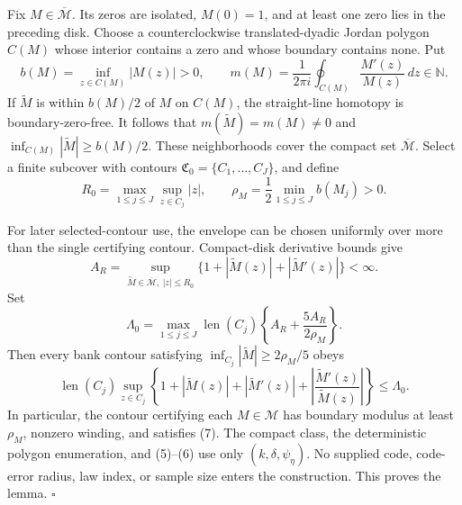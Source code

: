 Fix \(M\in\overline{\mathscr M}\).  Its zeros are isolated, \(M(0)=1\), and at least one zero lies in the preceding disk.  Choose a counterclockwise translated-dyadic Jordan polygon \(C(M)\) whose interior contains a zero and whose boundary contains none.  Put
\[
 b(M)=\inf_{z\in C(M)}|M(z)|>0,
 \qquad
 m(M)=\frac{1}{2\pi i}\oint_{C(M)}\frac{M'(z)}{M(z)}\,dz\in\mathbb N. \tag{4}
\]
If \(\widetilde M\) is within \(b(M)/2\) of \(M\) on \(C(M)\), the straight-line homotopy is boundary-zero-free.  It follows that \(m(\widetilde M)=m(M)\ne0\) and \(\inf_{C(M)}|\widetilde M|\ge b(M)/2\).  These neighborhoods cover the compact set \(\overline{\mathscr M}\).  Select a finite subcover with contours \(\mathfrak C_0=\{C_1,\ldots,C_J\}\), and define
\[
 R_0=\max_{1\le j\le J}\sup_{z\in C_j}|z|,
 \qquad
 \rho_M=\frac12\min_{1\le j\le J}b(M_j)>0. \tag{5}
\]

For later selected-contour use, the envelope can be chosen uniformly over more than the single certifying contour.  Compact-disk derivative bounds give
\[
 A_R=\sup_{\widetilde M\in\overline{\mathscr M},\ |z|\le R_0}
 \{1+|\widetilde M(z)|+|\widetilde M'(z)|\}<\infty.
\]
Set
\[
 \Lambda_0=
 \max_{1\le j\le J}\operatorname{len}(C_j)
 \left\{A_R+\frac{5A_R}{2\rho_M}\right\}. \tag{6}
\]
Then every bank contour satisfying \(\inf_{C_j}|\widetilde M|\ge2\rho_M/5\) obeys
\[
 \operatorname{len}(C_j)\sup_{z\in C_j}
 \left\{1+|\widetilde M(z)|+|\widetilde M'(z)|+
 \left|\frac{\widetilde M'(z)}{\widetilde M(z)}\right|\right\}
 \le\Lambda_0. \tag{7}
\]
In particular, the contour certifying each \(M\in\mathscr M\) has boundary modulus at least \(\rho_M\), nonzero winding, and satisfies (7).  The compact class, the deterministic polygon enumeration, and (5)--(6) use only \((k,\delta,\psi_\eta)\).  No supplied code, code-error radius, law index, or sample size enters the construction.  This proves the lemma. \(\square\)